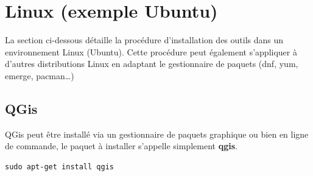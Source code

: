 \documentclass[10pt,a4paper]{article}
\begin{document}

\clearpage
\section{Linux (exemple Ubuntu)}

La section ci-dessous détaille la procédure d'installation des outils dans un
environnement Linux (Ubuntu). Cette procédure peut également s'appliquer à
d'autres distributions Linux en adaptant le gestionnaire de paquets (dnf, yum,
emerge, pacman\ldots)

\subsection{QGis}
QGis peut être installé via un gestionnaire de paquets graphique ou bien en
ligne de commande, le paquet à installer s'appelle simplement \textbf{qgis}.
\begin{verbatim}
sudo apt-get install qgis
\end{verbatim}
\end{document}
